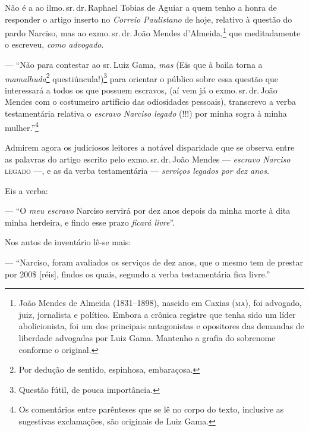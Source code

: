 Não é a ao ilmo.\,sr.\,dr.\,Raphael Tobias de Aguiar a quem tenho a honra
de responder o artigo inserto no \emph{Correio Paulistano} de hoje,
relativo à questão do pardo Narciso, mas ao exmo.\,sr.\,dr.\,João Mendes
d'Almeida,\footnote{ João Mendes de Almeida (1831--1898), nascido em
  Caxias (\textsc{ma}), foi advogado, juiz, jornalista e político. Embora a
  crônica registre que tenha sido um líder abolicionista, foi um dos
  principais antagonistas e opositores das demandas de liberdade
  advogadas por Luiz Gama. Mantenho a grafia do sobrenome conforme o
  original.} que meditadamente o escreveu, \emph{como advogado}.

--- ``Não para contestar ao sr.\,Luiz Gama, \emph{mas} (Eis que à baila
torna a \emph{mamalhuda}\footnote{ Por dedução de sentido,
  espinhosa, embaraçosa.} questiúncula!)\footnote{ Questão fútil, de
  pouca importância.} para orientar o público sobre essa questão que
interessará a todos os que possuem escravos, (aí vem já o exmo.\,sr.\,dr.\,João Mendes com o costumeiro artifício das odiosidades pessoais),
transcrevo a verba testamentária relativa o \emph{escravo Narciso
legado} (!!!) por minha sogra à minha mulher.''\footnote{ Os
  comentários entre parênteses que se lê no corpo do texto, inclusive as
  sugestivas exclamações, são originais de Luiz Gama.}

Admirem agora os judiciosos leitores a notável disparidade que se
observa entre as palavras do artigo escrito pelo exmo.\,sr.\,dr.\,João
Mendes --- \emph{escravo Narciso} \textsc{legado} ---, e as da verba
testamentária --- \emph{serviços legados por dez anos}.

Eis a verba:

--- ``O \emph{meu escravo} Narciso servirá por dez anos depois da minha
morte à dita minha herdeira, e findo esse prazo \emph{ficará livre}''.

Nos autos de inventário lê-se mais:

--- ``Narciso, foram avaliados os serviços de dez anos, que o mesmo tem
de prestar por 200\$ {[}réis{]}, findos os quais, segundo a verba
testamentária fica livre.''

